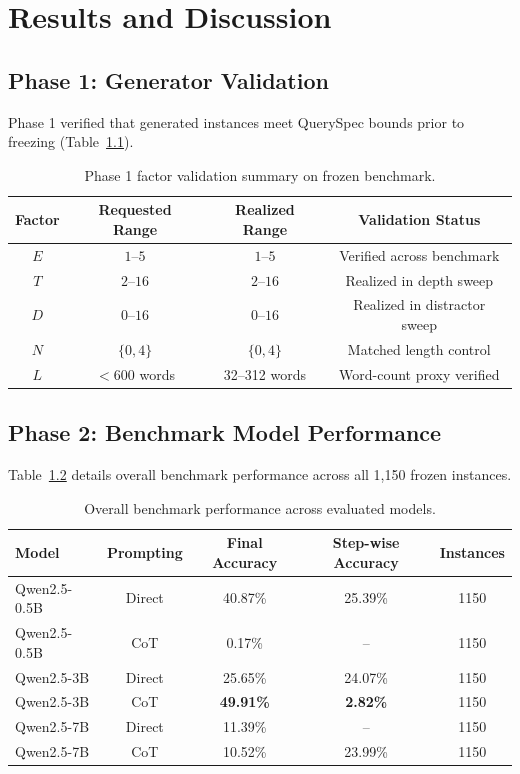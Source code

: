 \documentclass{iutbscthesis}
\begin{document}
\chapter{Results and Discussion}
\label{chap:results}

\section{Phase 1: Generator Validation}
Phase 1 verified that generated instances meet QuerySpec bounds prior to freezing (Table~\ref{tab:factor-validation}).

\begin{table}[H]
\centering
\small
\begin{tabular}{cccc}
\toprule
\textbf{Factor} & \textbf{Requested Range} & \textbf{Realized Range} & \textbf{Validation Status} \\
\midrule
$E$ & $1$--$5$ & $1$--$5$ & Verified across benchmark \\
$T$ & $2$--$16$ & $2$--$16$ & Realized in depth sweep \\
$D$ & $0$--$16$ & $0$--$16$ & Realized in distractor sweep \\
$N$ & $\{0, 4\}$ & $\{0, 4\}$ & Matched length control \\
$L$ & $<600$ words & 32--312 words & Word-count proxy verified \\
\bottomrule
\end{tabular}
\caption{Phase 1 factor validation summary on frozen benchmark.}
\label{tab:factor-validation}
\end{table}

\section{Phase 2: Benchmark Model Performance}
Table~\ref{tab:model-summary} details overall benchmark performance across all 1,150 frozen instances.

\begin{table}[H]
\centering
\small
\begin{tabular}{lcccc}
\toprule
\textbf{Model} & \textbf{Prompting} & \textbf{Final Accuracy} & \textbf{Step-wise Accuracy} & \textbf{Instances} \\
\midrule
Qwen2.5-0.5B & Direct & 40.87\% & 25.39\% & 1150 \\
Qwen2.5-0.5B & CoT & 0.17\% & -- & 1150 \\
Qwen2.5-3B & Direct & 25.65\% & 24.07\% & 1150 \\
Qwen2.5-3B & CoT & \textbf{49.91\%} & \textbf{2.82\%} & 1150 \\
Qwen2.5-7B & Direct & 11.39\% & -- & 1150 \\
Qwen2.5-7B & CoT & 10.52\% & 23.99\% & 1150 \\
\bottomrule
\end{tabular}
\caption{Overall benchmark performance across evaluated models.}
\label{tab:model-summary}
\end{table}
\end{document}
